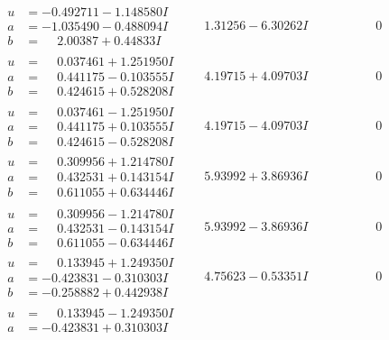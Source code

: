 \documentclass[1p]{elsarticle_modified}
\theoremstyle{definition}
\begin{document}
$$\begin{array}{c|c|c}
\begin{aligned}
u &= -0.492711 - 1.148580 I \\
a &= -1.035490 - 0.488094 I \\
b &= \phantom{-}2.00387 + 0.44833 I\end{aligned}
 & \phantom{-}1.31256 - 6.30262 I & \phantom{-0.000000 } 0 \\ \hline\begin{aligned}
u &= \phantom{-}0.037461 + 1.251950 I \\
a &= \phantom{-}0.441175 - 0.103555 I \\
b &= \phantom{-}0.424615 + 0.528208 I\end{aligned}
 & \phantom{-}4.19715 + 4.09703 I & \phantom{-0.000000 } 0 \\ \hline\begin{aligned}
u &= \phantom{-}0.037461 - 1.251950 I \\
a &= \phantom{-}0.441175 + 0.103555 I \\
b &= \phantom{-}0.424615 - 0.528208 I\end{aligned}
 & \phantom{-}4.19715 - 4.09703 I & \phantom{-0.000000 } 0 \\ \hline\begin{aligned}
u &= \phantom{-}0.309956 + 1.214780 I \\
a &= \phantom{-}0.432531 + 0.143154 I \\
b &= \phantom{-}0.611055 + 0.634446 I\end{aligned}
 & \phantom{-}5.93992 + 3.86936 I & \phantom{-0.000000 } 0 \\ \hline\begin{aligned}
u &= \phantom{-}0.309956 - 1.214780 I \\
a &= \phantom{-}0.432531 - 0.143154 I \\
b &= \phantom{-}0.611055 - 0.634446 I\end{aligned}
 & \phantom{-}5.93992 - 3.86936 I & \phantom{-0.000000 } 0 \\ \hline\begin{aligned}
u &= \phantom{-}0.133945 + 1.249350 I \\
a &= -0.423831 - 0.310303 I \\
b &= -0.258882 + 0.442938 I\end{aligned}
 & \phantom{-}4.75623 - 0.53351 I & \phantom{-0.000000 } 0 \\ \hline\begin{aligned}
u &= \phantom{-}0.133945 - 1.249350 I \\
a &= -0.423831 + 0.310303 I \\

\end{aligned}
\end{array}$$
\end{document}

